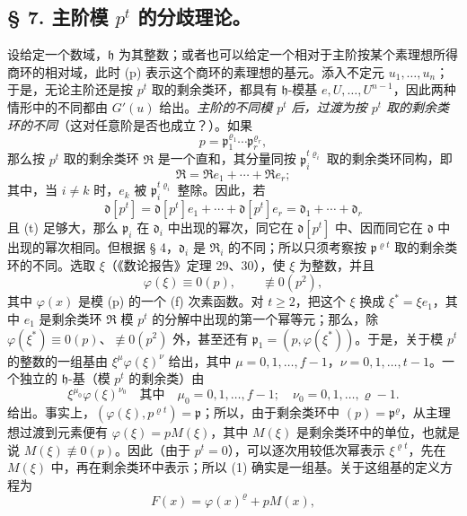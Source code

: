 \documentclass[11pt]{article}
\begin{document}
\subsection*{\S{} 7. 主阶模 \(p^t\) 的分歧理论。}

设给定一个数域，\(\mathfrak h\) 为其整数；或者也可以给定一个相对于主阶按某个素理想所得商环的相对域，此时 (p) 表示这个商环的素理想的基元。添入不定元 \(u_1,\ldots,u_n\)；于是，无论主阶还是按 \(p^t\) 取的剩余类环，都具有 \(\mathfrak h\)-模基 \(e,U,\ldots,U^{n-1}\)，因此两种情形中的不同都由 \(G'(u)\) 给出。\emph{主阶的不同模 \(p^t\) 后，过渡为按 \(p^t\) 取的剩余类环的不同}（这对任意阶是否也成立？）。如果
\[
p=\mathfrak p_1^{\varrho_1}\cdots\mathfrak p_r^{\varrho_r},
\]
那么按 \(p^t\) 取的剩余类环 \(\mathfrak R\) 是一个直和，其分量同按 \(\mathfrak p_i^{t\varrho_i}\) 取的剩余类环同构，即
\[
\mathfrak R=\mathfrak R e_1+\cdots+\mathfrak R e_r;
\]
其中，当 \(i\ne k\) 时，\(e_k\) 被 \(\mathfrak p_i^{t\varrho_i}\) 整除。因此，若
\[
\mathfrak d[p^t]=\mathfrak d[p^t]e_1+\cdots+\mathfrak d[p^t]e_r
=\mathfrak d_1+\cdots+\mathfrak d_r
\]
且 (t) 足够大，那么 \(\mathfrak p_i\) 在 \(\mathfrak d_i\) 中出现的幂次，同它在 \(\mathfrak d[p^t]\) 中、因而同它在 \(\mathfrak d\) 中出现的幂次相同。但根据 § 4，\(\mathfrak d_i\) 是 \(\mathfrak R_i\) 的不同；所以只须考察按 \(\mathfrak p^{\varrho t}\) 取的剩余类环的不同。选取 \(\xi\)（《数论报告》定理 29、30），使 \(\xi\) 为整数，并且
\[
\varphi(\xi)\equiv0(p),
\qquad \not\equiv0(p^2),
\]
其中 \(\varphi(x)\) 是模 (p) 的一个 (f) 次素函数。对 \(t\ge2\)，把这个 \(\xi\) 换成 \(\xi^*=\xi e_1\)，其中 \(e_1\) 是剩余类环 \(\mathfrak R\) 模 \(p^t\) 的分解中出现的第一个幂等元；那么，除 \(\varphi(\xi^*)\equiv0(p)\)、\(\not\equiv0(p^2)\) 外，甚至还有 \(\mathfrak p_1=(p,\varphi(\xi^*))\)。于是，关于模 \(p^t\) 的整数的一组基由 \(\xi^\mu\varphi(\xi)^\nu\) 给出，其中 \(\mu=0,1,\ldots,f-1\)，\(\nu=0,1,\ldots,t-1\)。一个独立的 \(\mathfrak h\)-基（模 \(p^t\) 的剩余类）由
\begin{equation}
\xi^{\mu_0}\varphi(\xi)^{\nu_0}
\quad\text{其中}\quad
\mu_0=0,1,\ldots,f-1;
\quad \nu_0=0,1,\ldots,\varrho-1. \tag{1}
\end{equation}
给出。事实上，\((\varphi(\xi),p^{\varrho t})=\mathfrak p\)；所以，由于剩余类环中 \((p)=\mathfrak p^\varrho\)，从主理想过渡到元素便有 \(\varphi(\xi)=pM(\xi)\)，其中 \(M(\xi)\) 是剩余类环中的单位，也就是说 \(M(\xi)\not\equiv0(p)\)。因此（由于 \(p^t=0\)），可以逐次用较低次幂表示 \(\xi^{\varrho t}\)，先在 \(M(\xi)\) 中，再在剩余类环中表示；所以 (1) 确实是一组基。关于这组基的定义方程为
\[
F(x)=\varphi(x)^\varrho+pM(x),
\]
\end{document}
